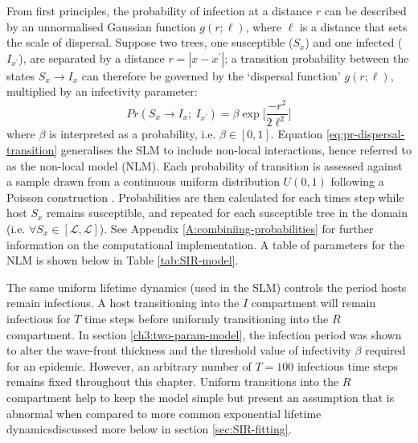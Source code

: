 From first principles, the probability of infection at a distance $r$ can be described by an unnormalised Gaussian function $g(r; \ell)$,
where $\ell$ is a distance that sets the scale of dispersal. 
Suppose two trees, one susceptible ($S_x$) and one infected ($I_{x^\prime}$), are separated by a distance $r=|x - x^\prime|$;
a transition probability between the states $S_x \rightarrow I_x$ can therefore be governed by the `dispersal function' $g(r; \ell)$, multiplied by an infectivity parameter:
\begin{equation}
\label{eq:pr-dispersal-transition}
    Pr(S_{x} \rightarrow I_{x} ;\ I_{x^{\prime}} ) = \beta \exp\Big[\frac{-r^2}{2\ell^2}\Big]
\end{equation}
where $\beta$ is interpreted as a probability, i.e. $\beta \in [0, 1]$. 
Equation \ref{eq:pr-dispersal-transition} generalises the SLM to include non-local interactions, hence referred to as the non-local model (NLM).
Each probability of transition is assessed against a sample drawn from a continuous uniform distribution $U(0, 1)$ following a Poisson construction \cite{cook2008constructing}. 
Probabilities are then calculated for each times step while host $S_x$ 
remains susceptible, and repeated for each susceptible tree in the domain (i.e. $\forall S_x \in [\mathcal{L}, \mathcal{L}]$).
See Appendix \ref{A:combiniing-probabilities} for further information on the computational implementation. A table of parameters for the NLM is shown below in Table \ref{tab:SIR-model}.

The same uniform lifetime dynamics (used in the SLM) controls the period hosts remain infectious.
A host transitioning into the $I$ compartment will remain infectious for $T$ time steps before uniformly transitioning into the $R$ compartment.
In section \ref{ch3:two-param-model}, the infection period was shown to alter the wave-front thickness and the threshold value of infectivity $\beta$ required for an epidemic. 
However, an arbitrary number of $T=100$ infectious time steps remains fixed throughout this chapter.
Uniform transitions into the $R$ compartment help to keep the model simple but present an assumption that is abnormal when compared to more common exponential lifetime dynamics\textemdash discussed more below in section \ref{sec:SIR-fitting}.

